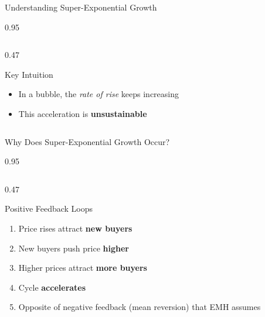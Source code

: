 \documentclass[9pt, aspectratio=169, t]{beamer}
\begin{document}
\begin{frame}{Understanding Super-Exponential Growth}
\begin{cminipage}{0.95\textwidth}
{\begin{columns}[T]
\begin{column}{0.47\textwidth}
            \begin{block}{Key Intuition}
                \begin{itemize}\setlength{\itemsep}{0pt}
                    \item In a bubble, the \textit{rate of rise} keeps increasing
                    \item This acceleration is \textbf{unsustainable}
                \end{itemize}
            \end{block}
        \end{column}
    \end{columns}
    }
    \end{cminipage}
\end{frame}

\begin{frame}{Why Does Super-Exponential Growth Occur?}
    \begin{cminipage}{0.95\textwidth}
    {\footnotesize
    \begin{columns}[T]
        \begin{column}{0.47\textwidth}
            \begin{block}{Positive Feedback Loops}
                \begin{enumerate}\setlength{\itemsep}{1pt}
                    \item Price rises attract \textbf{new buyers}
                    \item New buyers push price \textbf{higher}
                    \item Higher prices attract \textbf{more buyers}
                    \item Cycle \textbf{accelerates}
                    \item Opposite of negative feedback (mean reversion) that EMH assumes
                \end{enumerate}
            \end{block}


\end{column}
\end{columns}}
\end{cminipage}
\end{frame}
\end{document}
